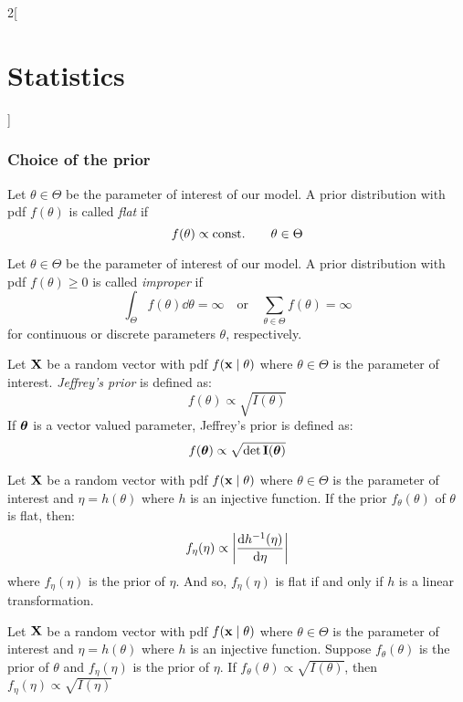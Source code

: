 \documentclass[../../../main.tex]{subfiles}
\begin{document}
\begin{multicols}{2}[\section{Statistics}]
  \subsubsection{Choice of the prior}
  \begin{definition}
    Let $\theta\in\Theta$ be the parameter of interest of our model. A prior distribution with pdf $f(\theta)$ is called \emph{flat} if $$f(\theta)\propto\text{const.}\qquad\theta\in\Theta$$
  \end{definition}
  \begin{definition}
    Let $\theta\in\Theta$ be the parameter of interest of our model. A prior distribution with pdf $f(\theta)\geq 0$ is called \emph{improper} if $$\int_\Theta f(\theta)\dd{\theta}=\infty\quad\text{or}\quad\sum_{\theta\in\Theta}f(\theta)=\infty$$ for continuous or discrete parameters $\theta$, respectively.
  \end{definition}
  \begin{definition}
    Let $\boldsymbol{\mathrm{X}}$ be a random vector with pdf $f(\boldsymbol{\mathrm{x}}\mid \theta)$ where $\theta\in\Theta$ is the parameter of interest. \emph{Jeffrey's prior} is defined as: $$f(\theta)\propto\sqrt{I(\theta)}$$
    If $\boldsymbol{\mathrm{\theta}}$ is a vector valued parameter, Jeffrey's prior is defined as: $$f(\boldsymbol{\mathrm{\theta}})\propto\sqrt{\det\boldsymbol{\mathrm{I}}(\boldsymbol{\mathrm{\theta}})}$$
  \end{definition}
  \begin{proposition}
    Let $\boldsymbol{\mathrm{X}}$ be a random vector with pdf $f(\boldsymbol{\mathrm{x}}\mid \theta)$ where $\theta\in\Theta$ is the parameter of interest and $\eta=h(\theta)$ where $h$ is an injective function. If the prior $f_\theta(\theta)$ of $\theta$ is flat, then: $$f_\eta(\eta)\propto\abs{\dv{h^{-1}(\eta)}{\eta}}$$ where $f_\eta(\eta)$ is the prior of $\eta$. And so, $f_\eta(\eta)$ is flat if and only if $h$ is a linear transformation.
  \end{proposition}
  \begin{proposition}
    Let $\boldsymbol{\mathrm{X}}$ be a random vector with pdf $f(\boldsymbol{\mathrm{x}}\mid \theta)$ where $\theta\in\Theta$ is the parameter of interest and $\eta=h(\theta)$ where $h$ is an injective function. Suppose $f_\theta(\theta)$ is the prior of $\theta$ and $f_\eta(\eta)$ is the prior of $\eta$. If $f_\theta(\theta)\propto\sqrt{I(\theta)}$, then $f_\eta(\eta)\propto\sqrt{I(\eta)}$
  \end{proposition}

\end{multicols}
\end{document}
